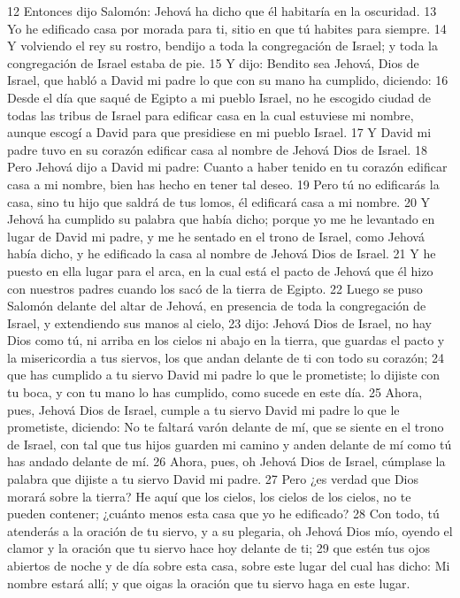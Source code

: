 12 Entonces dijo Salomón: Jehová ha dicho que él habitaría en la oscuridad.
13 Yo he edificado casa por morada para ti, sitio en que tú habites para siempre.
14 Y volviendo el rey su rostro, bendijo a toda la congregación de Israel; y toda la congregación de Israel estaba de pie.
15 Y dijo: Bendito sea Jehová, Dios de Israel, que habló a David mi padre lo que con su mano ha cumplido, diciendo:
16 Desde el día que saqué de Egipto a mi pueblo Israel, no he escogido ciudad de todas las tribus de Israel para edificar casa en la cual estuviese mi nombre, aunque escogí a David para que presidiese en mi pueblo Israel. 
17 Y David mi padre tuvo en su corazón edificar casa al nombre de Jehová Dios de Israel.
18 Pero Jehová dijo a David mi padre: Cuanto a haber tenido en tu corazón edificar casa a mi nombre, bien has hecho en tener tal deseo. 
19 Pero tú no edificarás la casa, sino tu hijo que saldrá de tus lomos, él edificará casa a mi nombre. 
20 Y Jehová ha cumplido su palabra que había dicho; porque yo me he levantado en lugar de David mi padre, y me he sentado en el trono de Israel, como Jehová había dicho, y he edificado la casa al nombre de Jehová Dios de Israel.
21 Y he puesto en ella lugar para el arca, en la cual está el pacto de Jehová que él hizo con nuestros padres cuando los sacó de la tierra de Egipto.
22 Luego se puso Salomón delante del altar de Jehová, en presencia de toda la congregación de Israel, y extendiendo sus manos al cielo,
23 dijo: Jehová Dios de Israel, no hay Dios como tú, ni arriba en los cielos ni abajo en la tierra, que guardas el pacto y la misericordia a tus siervos, los que andan delante de ti con todo su corazón;
24 que has cumplido a tu siervo David mi padre lo que le prometiste; lo dijiste con tu boca, y con tu mano lo has cumplido, como sucede en este día.
25 Ahora, pues, Jehová Dios de Israel, cumple a tu siervo David mi padre lo que le prometiste, diciendo: No te faltará varón delante de mí, que se siente en el trono de Israel, con tal que tus hijos guarden mi camino y anden delante de mí como tú has andado delante de mí.
26 Ahora, pues, oh Jehová Dios de Israel, cúmplase la palabra que dijiste a tu siervo David mi padre.
27 Pero ¿es verdad que Dios morará sobre la tierra? He aquí que los cielos, los cielos de los cielos, no te pueden contener; ¿cuánto menos esta casa que yo he edificado? 
28 Con todo, tú atenderás a la oración de tu siervo, y a su plegaria, oh Jehová Dios mío, oyendo el clamor y la oración que tu siervo hace hoy delante de ti;
29 que estén tus ojos abiertos de noche y de día sobre esta casa, sobre este lugar del cual has dicho: Mi nombre estará allí; y que oigas la oración que tu siervo haga en este lugar.
